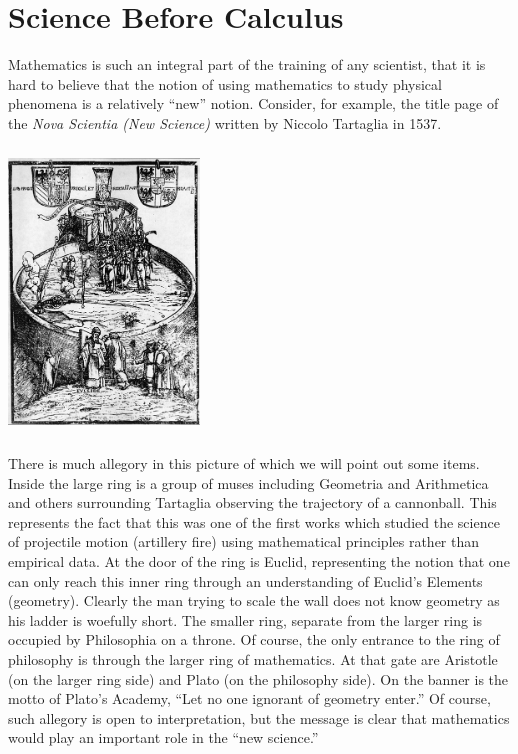 \chapter{Science Before Calculus}
\label{chapt:pre-calculus}
\aptta{}
Mathematics is such an integral part of the training of any scientist,
that it is hard to believe that the notion of using mathematics to
study physical phenomena is a relatively “new” notion.  Consider, for
example, the title page of the \emph{Nova Scientia (New Science)} written by
Niccolo Tartaglia in 1537. 

\centerline{\includegraphics*[height=3in,width=2in]{Figures/NovaScientia}}

There is much allegory in this picture of which we will point out some
items.  Inside the large ring is a group of muses including Geometria
and Arithmetica and others surrounding Tartaglia observing the
trajectory of a cannonball.  This represents the fact that this was
one of the first works which studied the science of projectile motion
(artillery fire) using mathematical principles rather than empirical
data.  At the door of the ring is Euclid, representing the notion that
one can only reach this inner ring through an understanding of
Euclid’s Elements (geometry).  Clearly the man trying to scale the
wall does not know geometry as his ladder is woefully short.  The
smaller ring, separate from the larger ring is occupied by Philosophia
on a throne.  Of course, the only entrance to the ring of philosophy
is through the larger ring of mathematics.    At that gate are
Aristotle (on the larger ring side) and Plato (on the philosophy
side).  On the banner is the motto of Plato’s Academy, “Let no one
ignorant of geometry enter.”  Of course, such allegory is open to
interpretation, but the message is clear that mathematics would play
an important role in the “new science.”    

